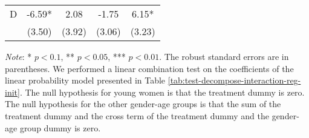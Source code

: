 \documentclass[12pt, a4paper]{article}
\begin{document}
\begin{table}[H]
\begin{threeparttable}
\begin{tabular}[t]{lcccc}
\hspace{1em}D & -6.59* & 2.08 & -1.75 & 6.15*\\
\hspace{1em} & (3.50) & (3.92) & (3.06) & (3.23)\\
\bottomrule
\end{tabular}
\begin{tablenotes}
\item \emph{Note}: * $p < 0.1$, ** $p < 0.05$, *** $p < 0.01$. The robust standard errors are in parentheses. We performed a linear combination test on the coefficients of the linear probability model presented in Table \ref{tab:test-decompose-interaction-reg-init}. The null hypothesis for young women is that the treatment dummy is zero. The null hypothesis for the other gender-age groups is that the sum of the treatment dummy and the cross term of the treatment dummy and the gender-age group dummy is zero.
\end{tablenotes}
\end{threeparttable}
\end{table}
\end{document}
